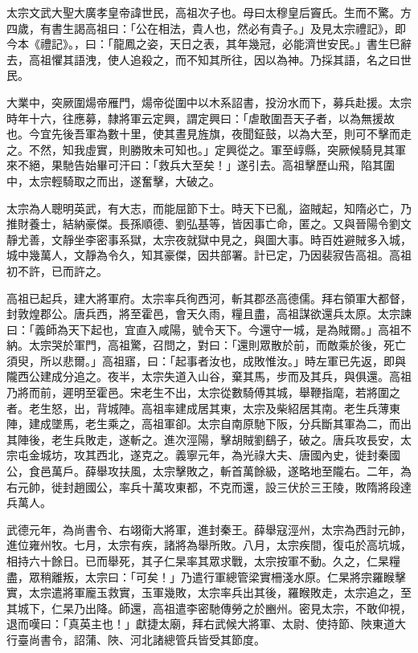 
\begin{pinyinscope}

 太宗文武大聖大廣孝皇帝諱世民，高祖次子也。母曰太穆皇后竇氏。生而不驚。方四歲，有書生謁高祖曰：「公在相法，貴人也，然必有貴子。」及見太宗禮記》，即今本《禮記》。，曰：「龍鳳之姿，天日之表，其年幾冠，必能濟世安民。」書生巳辭去，高祖懼其語洩，使人追殺之，而不知其所往，因以為神。乃採其語，名之曰世民。



 大業中，突厥圍煬帝雁門，煬帝從圍中以木系詔書，投汾水而下，募兵赴援。太宗時年十六，往應募，隸將軍云定興，謂定興曰：「虐敢圍吾天子者，以為無援故也。今宜先後吾軍為數十里，使其晝見旌旗，夜聞鉦鼓，以為大至，則可不擊而走之。不然，知我虛實，則勝敗未可知也。」定興從之。軍至崞縣，突厥候騎見其軍來不絕，果馳告始畢可汗曰：「救兵大至矣！」遂引去。高祖擊歷山飛，陷其圍中，太宗輕騎取之而出，遂奮擊，大破之。



 太宗為人聰明英武，有大志，而能屈節下士。時天下已亂，盜賊起，知隋必亡，乃推財養士，結納豪傑。長孫順德、劉弘基等，皆因事亡命，匿之。又與晉陽令劉文靜尤善，文靜坐李密事系獄，太宗夜就獄中見之，與圖大事。時百姓避賊多入城，城中幾萬人，文靜為令久，知其豪傑，因共部署。計已定，乃因裴寂告高祖。高祖初不許，已而許之。



 高祖已起兵，建大將軍府。太宗率兵徇西河，斬其郡丞高德儒。拜右領軍大都督，封敦煌郡公。唐兵西，將至霍邑，會天久雨，糧且盡，高祖謀欲還兵太原。太宗諫曰：「義師為天下起也，宜直入咸陽，號令天下。今還守一城，是為賊爾。」高祖不納。太宗哭於軍門，高祖驚，召問之，對曰：「還則眾散於前，而敵乘於後，死亡須臾，所以悲爾。」高祖寤，曰：「起事者汝也，成敗惟汝。」時左軍已先返，即與隴西公建成分追之。夜半，太宗失道入山谷，棄其馬，步而及其兵，與俱還。高祖乃將而前，遲明至霍邑。宋老生不出，太宗從數騎傅其城，舉鞭指麾，若將圍之者。老生怒，出，背城陣。高祖率建成居其東，太宗及柴紹居其南。老生兵薄東陣，建成墜馬，老生乘之，高祖軍卻。太宗自南原馳下阪，分兵斷其軍為二，而出其陣後，老生兵敗走，遂斬之。進次涇陽，擊胡賊劉鷂子，破之。唐兵攻長安，太宗屯金城坊，攻其西北，遂克之。義寧元年，為光祿大夫、唐國內史，徙封秦國公，食邑萬戶。薛舉攻扶風，太宗擊敗之，斬首萬餘級，遂略地至隴右。二年，為右元帥，徙封趙國公，率兵十萬攻東都，不克而還，設三伏於三王陵，敗隋將段達兵萬人。



 武德元年，為尚書令、右翊衛大將軍，進封秦王。薛舉寇涇州，太宗為西討元帥，進位雍州牧。七月，太宗有疾，諸將為舉所敗。八月，太宗疾間，復屯於高坑城，相持六十餘日。已而舉死，其子仁杲率其眾求戰，太宗按軍不動。久之，仁杲糧盡，眾稍離叛，太宗曰：「可矣！」乃遣行軍總管梁實柵淺水原。仁杲將宗羅睺擊實，太宗遣將軍龐玉救實，玉軍幾敗，太宗率兵出其後，羅睺敗走，太宗追之，至其城下，仁杲乃出降。師還，高祖遣李密馳傳勞之於豳州。密見太宗，不敢仰視，退而嘆曰：「真英主也！」獻捷太廟，拜右武候大將軍、太尉、使持節、陜東道大行臺尚書令，詔蒲、陜、河北諸總管兵皆受其節度。




\end{pinyinscope}
